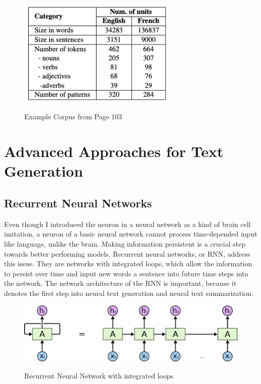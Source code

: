 \begin{figure}
	\begin{center}
		\includegraphics[width=3in]{photos/corpus}\\
		\caption{Example Corpus from \cite{elena} Page 103}\label{corpus}
	\end{center}
\end{figure}

\section{Advanced Approaches for Text Generation}\label{ss:aatg}
\subsection{Recurrent Neural Networks}\label{ss:rnn}
Even though I introduced the neuron in a neural network as a kind of brain cell imitation, a neuron of a basic neural network cannot process time-depended input like language, unlike the brain. Making information persistent is a crucial step towards better performing models. Recurrent neural networks, or RNN, address this issue. They are networks with integrated loops, which allow the information to persist over time and input new words a sentence into future time steps into the network\cite{olah}. The network architecture of the RNN is important, because it denotes the first step into neural text generation and neural text summarization. 

\begin{figure}
	\begin{center}
		\includegraphics[width=4.5in]{photos/RNN-unrolled}\\
		\caption{Recurrent Neural Network with integrated loops \cite{olah}}\label{rnn}
	\end{center}
\end{figure}

